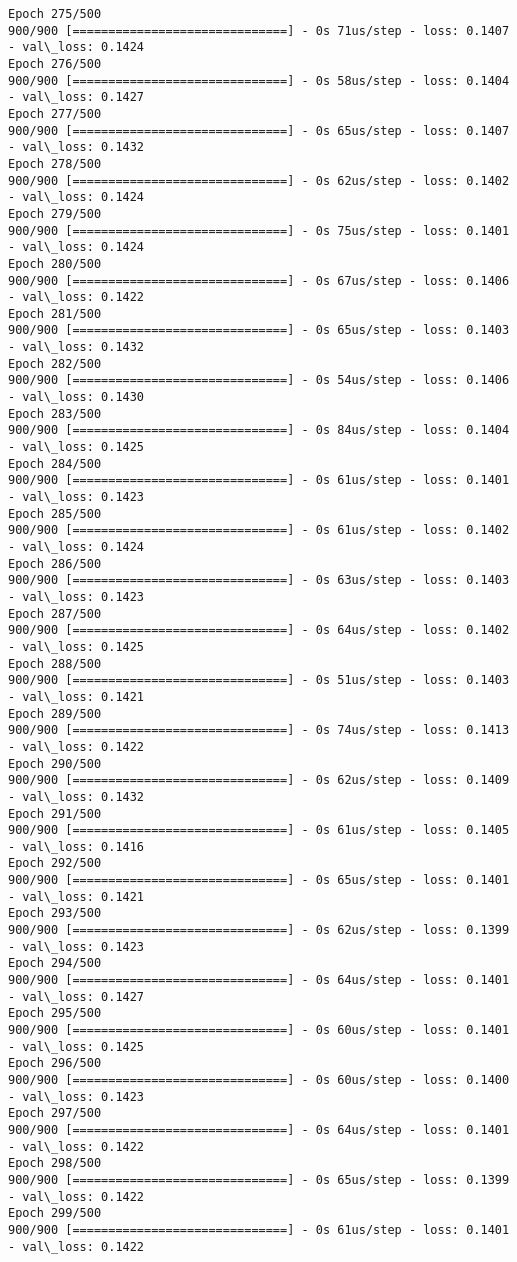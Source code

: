 \documentclass[11pt]{article}
\begin{document}
\begin{Verbatim}[commandchars=\\\{\}]
Epoch 275/500
900/900 [==============================] - 0s 71us/step - loss: 0.1407 - val\_loss: 0.1424
Epoch 276/500
900/900 [==============================] - 0s 58us/step - loss: 0.1404 - val\_loss: 0.1427
Epoch 277/500
900/900 [==============================] - 0s 65us/step - loss: 0.1407 - val\_loss: 0.1432
Epoch 278/500
900/900 [==============================] - 0s 62us/step - loss: 0.1402 - val\_loss: 0.1424
Epoch 279/500
900/900 [==============================] - 0s 75us/step - loss: 0.1401 - val\_loss: 0.1424
Epoch 280/500
900/900 [==============================] - 0s 67us/step - loss: 0.1406 - val\_loss: 0.1422
Epoch 281/500
900/900 [==============================] - 0s 65us/step - loss: 0.1403 - val\_loss: 0.1432
Epoch 282/500
900/900 [==============================] - 0s 54us/step - loss: 0.1406 - val\_loss: 0.1430
Epoch 283/500
900/900 [==============================] - 0s 84us/step - loss: 0.1404 - val\_loss: 0.1425
Epoch 284/500
900/900 [==============================] - 0s 61us/step - loss: 0.1401 - val\_loss: 0.1423
Epoch 285/500
900/900 [==============================] - 0s 61us/step - loss: 0.1402 - val\_loss: 0.1424
Epoch 286/500
900/900 [==============================] - 0s 63us/step - loss: 0.1403 - val\_loss: 0.1423
Epoch 287/500
900/900 [==============================] - 0s 64us/step - loss: 0.1402 - val\_loss: 0.1425
Epoch 288/500
900/900 [==============================] - 0s 51us/step - loss: 0.1403 - val\_loss: 0.1421
Epoch 289/500
900/900 [==============================] - 0s 74us/step - loss: 0.1413 - val\_loss: 0.1422
Epoch 290/500
900/900 [==============================] - 0s 62us/step - loss: 0.1409 - val\_loss: 0.1432
Epoch 291/500
900/900 [==============================] - 0s 61us/step - loss: 0.1405 - val\_loss: 0.1416
Epoch 292/500
900/900 [==============================] - 0s 65us/step - loss: 0.1401 - val\_loss: 0.1421
Epoch 293/500
900/900 [==============================] - 0s 62us/step - loss: 0.1399 - val\_loss: 0.1423
Epoch 294/500
900/900 [==============================] - 0s 64us/step - loss: 0.1401 - val\_loss: 0.1427
Epoch 295/500
900/900 [==============================] - 0s 60us/step - loss: 0.1401 - val\_loss: 0.1425
Epoch 296/500
900/900 [==============================] - 0s 60us/step - loss: 0.1400 - val\_loss: 0.1423
Epoch 297/500
900/900 [==============================] - 0s 64us/step - loss: 0.1401 - val\_loss: 0.1422
Epoch 298/500
900/900 [==============================] - 0s 65us/step - loss: 0.1399 - val\_loss: 0.1422
Epoch 299/500
900/900 [==============================] - 0s 61us/step - loss: 0.1401 - val\_loss: 0.1422

\end{Verbatim}
\end{document}
